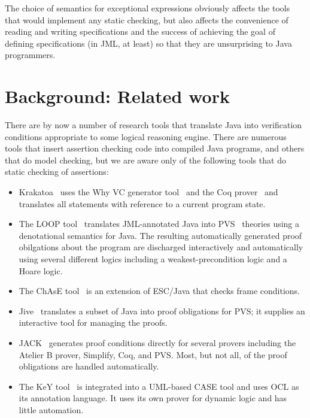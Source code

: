 \documentclass{sig-alternate}
\begin{document}
The choice of semantics for exceptional expressions obviously affects
the tools that would implement any static checking, but also affects
the convenience of reading and writing specifications and the success
of achieving the goal of defining specifications (in JML, at least) so
that they are unsurprising to Java programmers.

\section{Background: Related work}

There are by now a number of research tools that translate Java into
verification conditions appropriate to some logical reasoning engine.
There are numerous tools that insert assertion checking code into
compiled Java programs, and others that do model checking, but we are
aware only of the following tools that do static checking of
assertions:
\setlength{\partopsep}{0in}\setlength{\parskip}{0in}\setlength{\itemsep}{0in}\setlength{\topsep}{0in}
\begin{itemize}
\setlength{\partopsep}{0in}\setlength{\parskip}{0in}\setlength{\itemsep}{0in}\setlength{\topsep}{0in}
\item Krakatoa~\cite{krakatoa03a} uses the Why VC generator
  tool~\cite{Why} and the Coq prover~\cite{Why} and translates all
  statements with reference to a current program state.
\item The LOOP tool~\cite{Jacobs04,JacobsPoll01a} translates
  JML-annotated Java into PVS~\cite{OwreRRSS96} theories using a
  denotational semantics for Java.  The resulting automatically
  generated proof obilgations about the program are discharged
  interactively and automatically using several different logics
  including a weakest-precondition logic and a Hoare logic.
\item The ChAsE tool~\cite{CH03} is an extension of ESC/Java that
  checks frame conditions.
\item Jive~\cite{MeyerMuellerPoetzsch-Heffter00} translates a subset
  of Java into proof obligations for PVS; it supplies an interactive
  tool for managing the proofs.
\item JACK~\cite{JACK} generates proof conditions directly for several
  provers including the Atelier B prover, Simplify, Coq, and PVS.
  Most, but not all, of the proof obligations are handled
  automatically.
\item The KeY tool~\cite{Key2003} is integrated into a UML-based CASE
  tool and uses OCL as its annotation language.  It uses its own prover
  for dynamic logic and has little automation.
\end{itemize}
\end{document}
